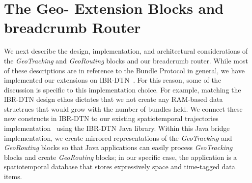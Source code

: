\documentclass{sig-alternate}
\begin{document}
\CopyrightYear
\crdata










%
%




%
%

\section{The Geo- Extension Blocks and {\sc breadcrumb} Router}
We next describe the design, implementation, and architectural
considerations of the {\em GeoTracking} and {\em GeoRouting} blocks
and our {\sc breadcrumb} router.
While most of these descriptions are in reference
to the Bundle Protocol in general, we have implemented our extensions
on IBR-DTN~\cite{IBR-DTN-WASA}. For this reason, some of the
discussion is specific to this implementation choice.
For example, matching the IBR-DTN design ethos dictates that we not create
any RAM-based data structrues that would grow with the number of
bundles held.  We connect these new constructs in IBR-DTN to our
existing spatiotemporal trajectories
implementation~\cite{michel12:spatiotemporal} using the IBR-DTN Java
library. Within this Java bridge implementation, we create mirrored
representations of the {\em GeoTracking} and {\em GeoRouting} blocks
so that Java applications can easily process {\em GeoTracking} blocks
and create {\em GeoRouting} blocks; in our specific case, the
application is a spatiotemporal database that stores expressively
space and time-tagged data items.
\end{document}
